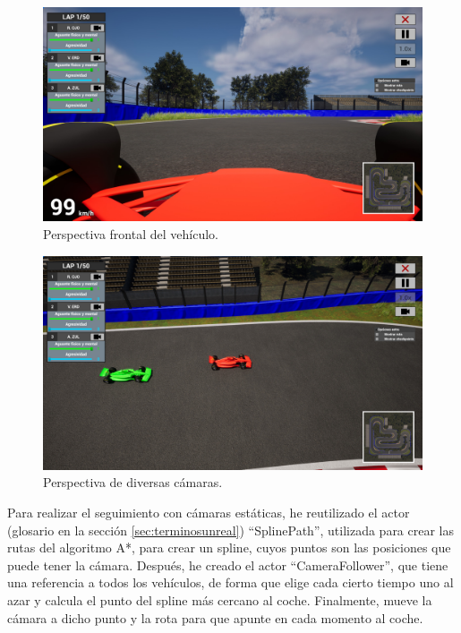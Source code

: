 \begin{figure}[H]
    \includegraphics[width=\textwidth]{imagenes/camera/cam-frontal.jpg}
    \caption{Perspectiva frontal del vehículo.}
    \label{fig:frontal}
\end{figure}

\begin{figure}[H]
    \includegraphics[width=\textwidth]{imagenes/camera/cam-pers.jpg}
    \caption{Perspectiva de diversas cámaras.}
    \label{fig:cam-estaticas}
\end{figure}

Para realizar el seguimiento con cámaras estáticas, he reutilizado el actor (glosario en la sección \ref{sec:terminosunreal}) ``SplinePath'', utilizada para crear las rutas del algoritmo A*, para crear un spline, cuyos puntos son las posiciones que puede tener la cámara. Después, he creado el actor ``CameraFollower'', que tiene una referencia a todos los vehículos, de forma que elige cada cierto tiempo uno al azar y calcula el punto del spline más cercano al coche. Finalmente, mueve la cámara a dicho punto y la rota para que apunte en cada momento al coche.

